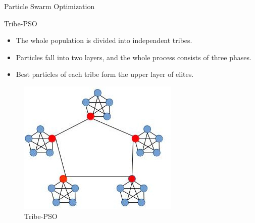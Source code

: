 \documentclass[table]{beamer}
\begin{document}

	\begin{frame}{Particle Swarm Optimization}
		\begin{block}{Tribe-PSO}
			\begin{itemize}
				\item The whole population is divided into independent tribes. \cite{chen2006tribe}
				\item Particles fall into two layers, and the whole process consists of three phases.
				\item Best particles of each tribe form the upper layer of elites.
			\end{itemize}
		\end{block}
		\begin{figure}[v]
			\includegraphics[scale=0.6]{tpso}
			\centering
			\caption{Tribe-PSO}
			\label{ref:tpso}
		\end{figure}		
	\end{frame}
	
\end{document}
